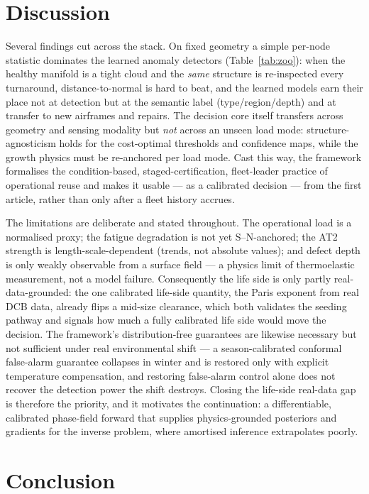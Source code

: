 \documentclass[11pt]{article}
\begin{document}
\section{Discussion}
Several findings cut across the stack. On fixed geometry a simple per-node
statistic dominates the learned anomaly detectors (Table~\ref{tab:zoo}): when the
healthy manifold is a tight cloud and the \emph{same} structure is re-inspected
every turnaround, distance-to-normal is hard to beat, and the learned models earn
their place not at detection but at the semantic label (type/region/depth) and at
transfer to new airframes and repairs. The decision core itself transfers across
geometry and sensing modality but \emph{not} across an unseen load mode:
structure-agnosticism holds for the cost-optimal thresholds and confidence maps,
while the growth physics must be re-anchored per load mode. Cast this way, the
framework formalises the condition-based, staged-certification, fleet-leader
practice of operational reuse and makes it usable --- as a calibrated decision ---
from the first article, rather than only after a fleet history accrues.

The limitations are deliberate and stated throughout. The operational load is a
normalised proxy; the fatigue degradation is not yet S--N-anchored; the AT2
strength is length-scale-dependent (trends, not absolute values); and defect depth
is only weakly observable from a surface field --- a physics limit of thermoelastic
measurement, not a model failure. Consequently the life side is only partly
real-data-grounded: the one calibrated life-side quantity, the Paris exponent from
real DCB data, already flips a mid-size clearance, which both validates the seeding
pathway and signals how much a fully calibrated life side would move the decision.
The framework's distribution-free guarantees are likewise necessary but not
sufficient under real environmental shift --- a season-calibrated conformal
false-alarm guarantee collapses in winter and is restored only with explicit
temperature compensation, and restoring false-alarm control alone does not recover
the detection power the shift destroys. Closing the life-side real-data gap is
therefore the priority, and it motivates the continuation: a differentiable,
calibrated phase-field forward that supplies physics-grounded posteriors and
gradients for the inverse problem, where amortised inference extrapolates poorly.

\section{Conclusion}
\end{document}
